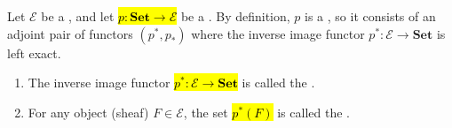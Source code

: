 \begin{definition} \label{definition:stalk_of_an_object_of_a_topos_at_a_point_of_the_topos}
Let $\mathcal{E}$ be a , and let \hl{$p: \mathbf{Set} \to \mathcal{E}$} be a . By definition, $p$ is a , so it consists of an adjoint pair of functors $(p^*, p_*)$ where the inverse image functor $p^*: \mathcal{E} \to \mathbf{Set}$ is left exact.
\begin{enumerate}
    \item The inverse image functor \hl{$p^*: \mathcal{E} \to \mathbf{Set}$} is called the .
    
    \item For any object (sheaf) $F \in \mathcal{E}$, the set \hl{$p^*(F)$} is called the .
\end{enumerate}
\end{definition}
